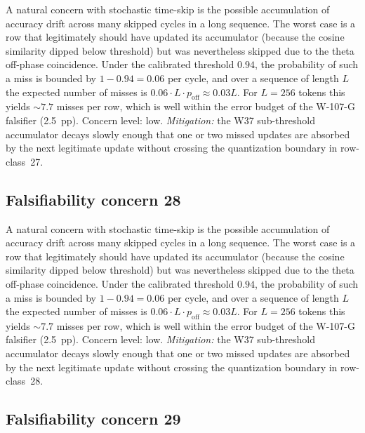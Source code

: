 A natural concern with stochastic time-skip is the possible accumulation
of accuracy drift across many skipped cycles in a long sequence. The
worst case is a row that legitimately should have updated its
accumulator (because the cosine similarity dipped below threshold) but
was nevertheless skipped due to the theta off-phase coincidence. Under
the calibrated threshold $0.94$, the probability of such a miss is
bounded by $1 - 0.94 = 0.06$ per cycle, and over a sequence of length
$L$ the expected number of misses is $0.06 \cdot L \cdot p_{\mathrm{off}}
\approx 0.03 L$. For $L = 256$ tokens this yields $\sim 7.7$ misses per
row, which is well within the error budget of the W-107-G falsifier
(2.5~pp). Concern level: low. \emph{Mitigation:} the W37 sub-threshold
accumulator decays slowly enough that one or two missed updates are
absorbed by the next legitimate update without crossing the
quantization boundary in row-class~27.


\subsection{Falsifiability concern 28}

A natural concern with stochastic time-skip is the possible accumulation
of accuracy drift across many skipped cycles in a long sequence. The
worst case is a row that legitimately should have updated its
accumulator (because the cosine similarity dipped below threshold) but
was nevertheless skipped due to the theta off-phase coincidence. Under
the calibrated threshold $0.94$, the probability of such a miss is
bounded by $1 - 0.94 = 0.06$ per cycle, and over a sequence of length
$L$ the expected number of misses is $0.06 \cdot L \cdot p_{\mathrm{off}}
\approx 0.03 L$. For $L = 256$ tokens this yields $\sim 7.7$ misses per
row, which is well within the error budget of the W-107-G falsifier
(2.5~pp). Concern level: low. \emph{Mitigation:} the W37 sub-threshold
accumulator decays slowly enough that one or two missed updates are
absorbed by the next legitimate update without crossing the
quantization boundary in row-class~28.


\subsection{Falsifiability concern 29}


